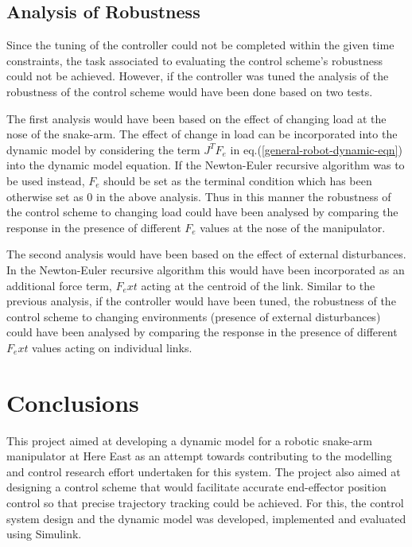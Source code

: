 \documentclass[a4paper,12pt]{report}
\begin{document}
\section{Analysis of Robustness}

Since the tuning of the controller could not be completed within the given time constraints, the task associated to evaluating the control scheme's robustness could not be achieved. However, if the controller was tuned the analysis of the robustness of the control scheme would have been done based on two tests.

The first analysis would have been based on the effect of changing load at the nose of the snake-arm. The effect of change in load can be incorporated into the dynamic model by considering the term $ J^TF_e $ in eq.(\ref{general-robot-dynamic-eqn}) into the dynamic model equation. If the Newton-Euler recursive algorithm was to be used instead, $ F_e $ should be set as the terminal condition which has been otherwise set as 0 in the above analysis. Thus in this manner the robustness of the control scheme to changing load could have been analysed by comparing the response in the presence of different $ F_e $ values at the nose of the manipulator.

The second analysis would have been based on the effect of external disturbances. In the Newton-Euler recursive algorithm this would have been incorporated as an additional force term, $ F_ext $ acting at the centroid of the link. Similar to the previous analysis, if the controller would have been tuned, the robustness of the control scheme to changing environments (presence of external disturbances) could have been analysed by comparing the response in the presence of different $ F_ext $ values acting on individual links.


\chapter{Conclusions}
This project aimed at developing a dynamic model for a robotic snake-arm manipulator at Here East as an attempt towards contributing to the modelling and control research effort undertaken for this system. The project also aimed at designing a control scheme that would facilitate accurate end-effector position control so that precise trajectory tracking could be achieved. For this, the control system design and the dynamic model was developed, implemented and evaluated using Simulink. 
\end{document}
